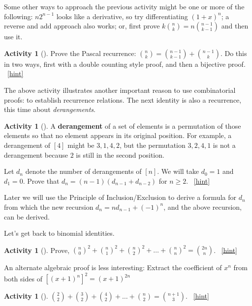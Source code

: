 \documentclass[10pt,]{book}
\newcommand{\terminology}[1]{\textbf{#1}}
\theoremstyle{plain}
\theoremstyle{definition}
\theoremstyle{definition}
\theoremstyle{definition}
\newtheorem{activity}[project]{Activity}
\numberwithin{equation}{chapter}
\begin{document}
\hypertarget{p-700}{}%
Some other ways to approach the previous activity might be one or more of the following: \(n2^{n - 1}\) looks like a derivative, so try differentiating \(\left( 1 + x \right)^{n}\); a reverse and add approach also works; or, first prove \(k \binom{n}{k} = n \binom{n - 1}{k - 1}\) and then use it.%
\begin{activity}[]\label{activity-92}
\hypertarget{p-701}{}%
Prove the Pascal recurrence: \(\binom{n}{k} = \binom{n - 1}{k-1} + \binom{n - 1}{k}\).  Do this in two ways, first with a double counting style proof, and then a bijective proof.%
~\hfill{\tiny\hyperlink{a-99}{[hint]}\hypertarget{q-99}{}}\end{activity}
\hypertarget{p-704}{}%
The above activity illustrates another important reason to use combinatorial proofs: to establish recurrence relations.  The next identity is also a recurrence, this time about \emph{derangements}.%
\begin{activity}[]\label{activity-93}
\hypertarget{p-705}{}%
A \terminology{derangement} of a set of elements is a permutation of those elements so that no element appears in its original position.  For example, a derangement of \([4]\) might be \(3,1,4,2\), but the permutation \(3,2,4,1\) is not a derangement because \(2\) is still in the second position.%
\par
\hypertarget{p-706}{}%
Let \(d_{n}\) denote the number of derangements of \([n]\).  We will take \(d_{0} = 1\) and \(d_{1} = 0\).  Prove that \(d_{n} = (n - 1)(d_{n - 1}+ d_{n - 2})\) for \(n \geq 2\).%
~\hfill{\tiny\hyperlink{a-100}{[hint]}\hypertarget{q-100}{}}\end{activity}
\hypertarget{p-709}{}%
Later we will use the Principle of Inclusion/Exclusion to derive a formula for \(d_{n}\) from which the new recursion \(d_{n} = nd_{n - 1} + \left( - 1 \right)^{n}\), and the above recursion, can be derived.%
\par
\hypertarget{p-710}{}%
Let's get back to binomial identities.%
\begin{activity}[]\label{activity-94}
\hypertarget{p-711}{}%
Prove, \(\binom{n}{0}^{2} + \binom{n}{1}^{2} + \binom{n}{2}^{2} + \ldots + \binom{n}{n}^{2} = \binom{2n}{n}\).%
~\hfill{\tiny\hyperlink{a-101}{[hint]}\hypertarget{q-101}{}}\end{activity}
\hypertarget{p-714}{}%
An alternate algebraic proof is less interesting: Extract the coefficient of \(x^{n}\) from both sides of \(\left\lbrack \left( x + 1 \right)^{n} \right\rbrack^{2} = \left(x + 1 \right)^{2n}\)%
\begin{activity}[]\label{activity-95}
\hypertarget{p-715}{}%
\(\binom{2}{2} + \binom{3}{2} + \binom{4}{2} + \ldots + \binom{n}{2} = \binom{n + 1}{3}\).%
~\hfill{\tiny\hyperlink{a-102}{[hint]}\hypertarget{q-102}{}}\end{activity}
\end{document}
